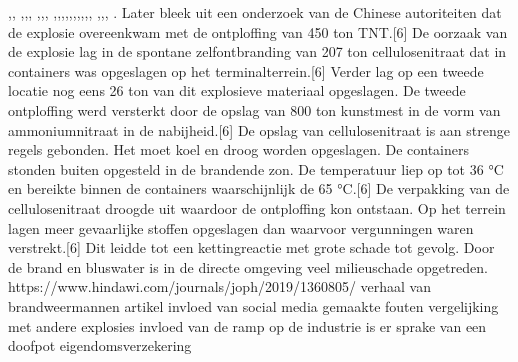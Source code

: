 \cite{thehindu15062019chinaExplosion},\cite{santagotimes24032019chinablast},
\cite{klingecorp28042020causedTanjin},\cite{mcgarryExplosions2017},\cite{roswnfeld13082015TanjinReports},
\cite{aria12082015explosionaTanjin},\cite{tremblay11022016chineseInvestigatorsTanjin},\cite{taylor13082015TanjinExplosianAftermath},
\cite{associatedPresss13082013},\cite{un20082015InvestigationTanjin},\cite{france2412082015TnjinExplosion},\cite{npr14082015TanjinCause},\cite{bbc05022016TanjinResponsibles},\cite{CBodeen15082015TanjinExplosion},\cite{reutersTanjinInsurance},\cite{yu082016evaluationTanjin2015},\cite{wiki2015TanjinExplosions},\cite{bbc17082015whathappenedTanjin},
\cite{mortimer19082016taijinexplosioncrater},\cite{internationallabourofficeChmControlTooliit},\cite{euTaxationCustomsICSC},
\cite{iloWHOChemSafetyCards}.
Later bleek uit een onderzoek van de Chinese autoriteiten dat de explosie overeenkwam met de ontploffing van 450 ton TNT.[6] 
De oorzaak van de explosie lag in de spontane zelfontbranding van 207 ton cellulosenitraat dat in containers was opgeslagen op het terminalterrein.[6] 
Verder lag op een tweede locatie nog eens 26 ton van dit explosieve materiaal opgeslagen.
De tweede ontploffing werd versterkt door de opslag van 800 ton kunstmest in de vorm van ammoniumnitraat in de nabijheid.[6]
De opslag van cellulosenitraat is aan strenge regels gebonden. Het moet koel en droog worden opgeslagen. De containers stonden buiten opgesteld in de brandende zon. De temperatuur liep op tot 36 °C en bereikte binnen de containers waarschijnlijk de 65 °C.[6] De verpakking van de cellulosenitraat droogde uit waardoor de ontploffing kon ontstaan. Op het terrein lagen meer gevaarlijke stoffen opgeslagen dan waarvoor vergunningen waren verstrekt.[6] Dit leidde tot een kettingreactie met grote schade tot gevolg. Door de brand en bluswater is in de directe omgeving veel milieuschade opgetreden.
https://www.hindawi.com/journals/joph/2019/1360805/ 
\cite{jiang16042019TanjinExplosion}
verhaal van brandweermannen
\cite{staff31082015tanjinblastunrevealed}
artikel
\cite{chinafile18082015tanjinexplosion}
invloed van social media
\cite{pinghuang2410201TanjinFactreport}
gemaakte fouten
\cite{portoTanjinExplosionSight}
\cite{imago17082015TanjinApartmentImages}
\cite{trager14082015Chemicalblast}
\cite{pangeramo27082015TanjinExplosion}
vergelijking met andere explosies
\cite{ap06082020ammaniumnitrate}
invloed van de ramp op de industrie
\cite{morris14082015TanjinIndustryImpact}
is er sprake van een doofpot
\cite{milesyu20082015exposingtoxicgovlines}
eigendomsverzekering
\cite{artemis30032016tanjininsurance}
